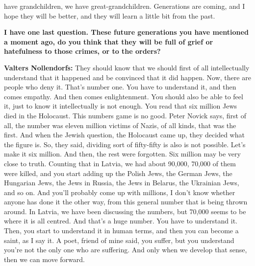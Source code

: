 have grandchildren, we have great-grandchildren. Generations are coming, and I hope they will be better, and they will learn a little bit from the past. 

\textbf{I have one last question. These future generations you have mentioned a moment ago, do you think that they will be full of grief or hatefulness to those crimes, or to the orders?}

\textbf{Valters Nollendorfs:} They should know that we should first of all intellectually understand that it happened and be convinced that it did happen. Now, there are people who deny it. That’s number one. You have to understand it, and then comes empathy. And then comes enlightenment. You should also be able to feel it, just to know it intellectually is not enough. You read that six million Jews died in the Holocaust. This numbers game is no good. Peter Novick says, first of all, the number was eleven million victims of Nazis, of all kinds, that was the first. And when the Jewish question, the Holocaust came up, they decided what the figure is. So, they said, dividing sort of fifty-fifty is also is not possible. Let’s make it six million. And then, the rest were forgotten. Six million may be very close to truth. Counting that in Latvia, we had about 90,000, 70,000 of them were killed, and you start adding up the Polish Jews, the German Jews, the Hungarian Jews, the Jews in Russia, the Jews in Belarus, the Ukrainian Jews, and so on. And you’ll probably come up with millions, I don’t know whether anyone has done it the other way, from this general number that is being thrown around. In Latvia, we have been discussing the numbers, but 70,000 seems to be where it is all centred. And that’s a huge number. You have to understand it. Then, you start to understand it in human terms, and then you can become a saint, as I say it. A poet, friend of mine said, you suffer, but you understand you’re not the only one who are suffering. And only when we develop that sense, then we can move forward. 
